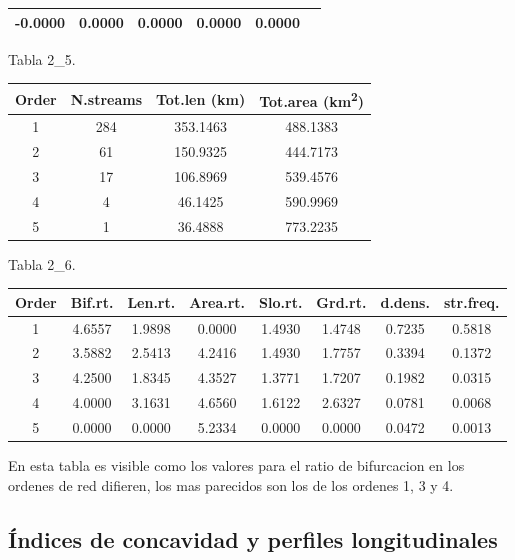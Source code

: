 \documentclass[11pt,]{article}
\begin{document}
\begin{longtable}[]{@{}cccccc@{}}
\begin{minipage}[t]{0.11\columnwidth}
-0.0000\strut
\end{minipage} & \begin{minipage}[t]{0.26\columnwidth}\centering\strut
0.0000\strut
\end{minipage} & \begin{minipage}[t]{0.11\columnwidth}\centering\strut
0.0000\strut
\end{minipage} & \begin{minipage}[t]{0.14\columnwidth}\centering\strut
0.0000\strut
\end{minipage} & \begin{minipage}[t]{0.13\columnwidth}\centering\strut
0.0000\strut
\end{minipage}\tabularnewline
\bottomrule
\end{longtable}

Tabla 2\_5.

\begin{longtable}[]{@{}cccc@{}}
\toprule
Order & N.streams & Tot.len (km) & Tot.area
(km\textsuperscript{2})\tabularnewline
\midrule
\endhead
1 & 284 & 353.1463 & 488.1383\tabularnewline
2 & 61 & 150.9325 & 444.7173\tabularnewline
3 & 17 & 106.8969 & 539.4576\tabularnewline
4 & 4 & 46.1425 & 590.9969\tabularnewline
5 & 1 & 36.4888 & 773.2235\tabularnewline
\bottomrule
\end{longtable}

Tabla 2\_6.

\begin{longtable}[]{@{}cccccccc@{}}
\toprule
Order & Bif.rt. & Len.rt. & Area.rt. & Slo.rt. & Grd.rt. & d.dens. &
str.freq.\tabularnewline
\midrule
\endhead
1 & 4.6557 & 1.9898 & 0.0000 & 1.4930 & 1.4748 & 0.7235 &
0.5818\tabularnewline
2 & 3.5882 & 2.5413 & 4.2416 & 1.4930 & 1.7757 & 0.3394 &
0.1372\tabularnewline
3 & 4.2500 & 1.8345 & 4.3527 & 1.3771 & 1.7207 & 0.1982 &
0.0315\tabularnewline
4 & 4.0000 & 3.1631 & 4.6560 & 1.6122 & 2.6327 & 0.0781 &
0.0068\tabularnewline
5 & 0.0000 & 0.0000 & 5.2334 & 0.0000 & 0.0000 & 0.0472 &
0.0013\tabularnewline
\bottomrule
\end{longtable}

En esta tabla es visible como los valores para el ratio de bifurcacion
en los ordenes de red difieren, los mas parecidos son los de los ordenes
1, 3 y 4.

\subsection{Índices de concavidad y perfiles
longitudinales}\label{uxedndices-de-concavidad-y-perfiles-longitudinales}
\end{document}
